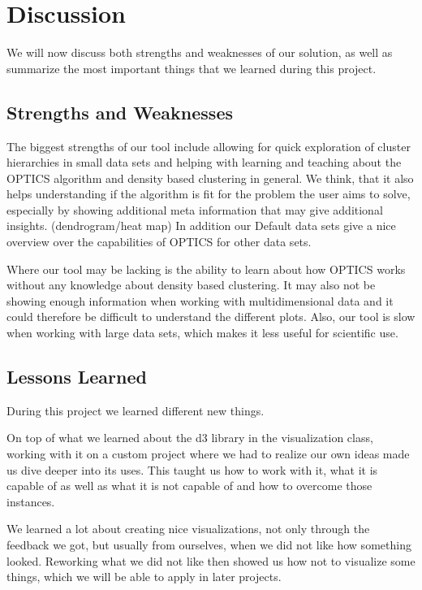 \documentclass{vgtc} %
\begin{document}
\section{Discussion}

We will now discuss both strengths and weaknesses of our solution, as well as
summarize the most important things that we learned during this project.

\subsection{Strengths and Weaknesses}

The biggest strengths of our tool include allowing for
quick exploration of cluster hierarchies in small data sets and helping with
learning and teaching about the OPTICS algorithm and density based clustering
in general. We think, that it also helps understanding if the algorithm is fit
for the problem the user aims to solve, especially by showing additional meta
information that may give additional insights. (dendrogram/heat map) In
addition our Default data sets give a nice overview over the capabilities of
OPTICS for other data sets.

Where our tool may be lacking is the ability to learn about how OPTICS works
without any knowledge about density based clustering. It may also not be
showing enough information when working with multidimensional data and it could
therefore be difficult to understand the different plots. Also, our tool is
slow when working with large data sets, which makes it less useful for
scientific use.

\subsection{Lessons Learned}

During this project we learned different new things.

On top of what we learned about the d3 library in the visualization class,
working with it on a custom project where we had to realize our own ideas made
us dive deeper into its uses. This taught us how to work with it, what it is
capable of as well as what it is not capable of and how to overcome those
instances.

We learned a lot about creating nice visualizations, not only through the
feedback we got, but usually from ourselves, when we did not like how something
looked. Reworking what we did not like then showed us how not to visualize some
things, which we will be able to apply in later projects.
\end{document}
